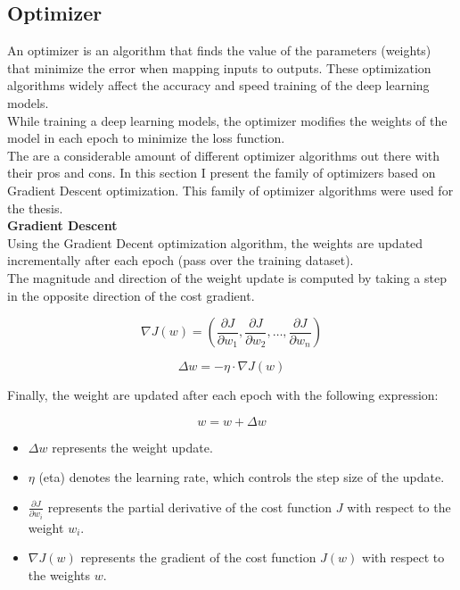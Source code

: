 \subsection{Optimizer}

An optimizer is an algorithm that finds the value of the parameters (weights) that minimize the error when mapping inputs to outputs. These optimization algorithms widely affect the accuracy and speed training of the deep learning models. \\

While training a deep learning models, the optimizer modifies the weights of the model in each epoch to minimize the loss function. \\

The are a considerable amount of different optimizer algorithms out there with their pros and cons. In this section I present the family of optimizers based on Gradient Descent optimization. This family of optimizer algorithms were used for the thesis. \\

\vspace{0.5cm}
\textbf{Gradient Descent} \\

Using the Gradient Decent optimization algorithm, the weights are updated incrementally after each epoch (pass over the training dataset). \\

The magnitude and direction of the weight update is computed by taking a step in the opposite direction of the cost gradient.

\[\nabla J(w) = (\frac{\partial J}{\partial w_1}, \frac{\partial J}{\partial w_2}, \ldots, \frac{\partial J}{\partial w_n})\]

\[
\Delta w = -\eta \cdot \nabla J(w)
\]

Finally, the weight are updated after each epoch with the following expression:

\[
w = w + \Delta w
\]


\begin{itemize}
    \item \(\Delta w\) represents the weight update.
    \item \(\eta\) (eta) denotes the learning rate, which controls the step size of the update.
    \item  \(\frac{\partial J}{\partial w_i}\) represents the partial derivative of the cost function \(J\) with respect to the weight \(w_i\).
    \item \(\nabla J(w)\) represents the gradient of the cost function \(J(w)\) with respect to the weights \(w\).
\end{itemize}

